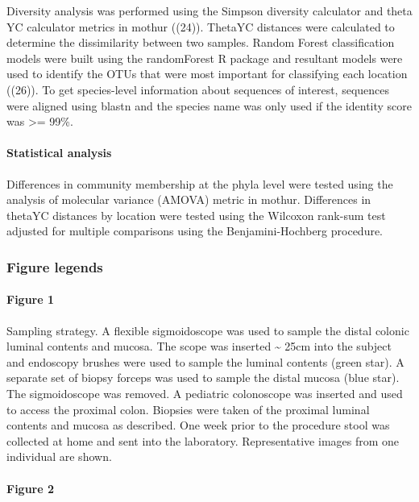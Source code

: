 \documentclass[11pt,]{article}
\let\oldparagraph\paragraph
\renewcommand{\paragraph}[1]{\oldparagraph{#1}\mbox{}}
\begin{document}
Diversity analysis was performed using the Simpson diversity calculator
and theta YC calculator metrics in mothur ((24)). ThetaYC distances were
calculated to determine the dissimilarity between two samples. Random
Forest classification models were built using the randomForest R package
and resultant models were used to identify the OTUs that were most
important for classifying each location ((26)). To get species-level
information about sequences of interest, sequences were aligned using
blastn and the species name was only used if the identity score was
\textgreater{}= 99\%.

\paragraph{Statistical analysis}\label{statistical-analysis}

Differences in community membership at the phyla level were tested using
the analysis of molecular variance (AMOVA) metric in mothur. Differences
in thetaYC distances by location were tested using the Wilcoxon rank-sum
test adjusted for multiple comparisons using the Benjamini-Hochberg
procedure.

\subsubsection{Figure legends}\label{figure-legends}

\paragraph{Figure 1}\label{figure-1}

Sampling strategy. A flexible sigmoidoscope was used to sample the
distal colonic luminal contents and mucosa. The scope was inserted
\textasciitilde{} 25cm into the subject and endoscopy brushes were used
to sample the luminal contents (green star). A separate set of biopsy
forceps was used to sample the distal mucosa (blue star). The
sigmoidoscope was removed. A pediatric colonoscope was inserted and used
to access the proximal colon. Biopsies were taken of the proximal
luminal contents and mucosa as described. One week prior to the
procedure stool was collected at home and sent into the laboratory.
Representative images from one individual are shown.

\paragraph{Figure 2}\label{figure-2}
\end{document}
